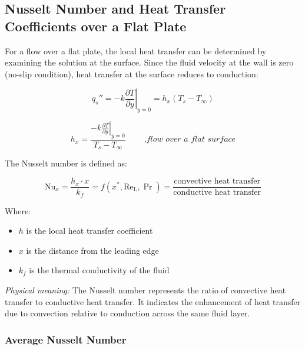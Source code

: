 \subsection*{Nusselt Number and Heat Transfer Coefficients over a Flat Plate}

For a flow over a flat plate, the local heat transfer can be determined by examining the solution at the surface. Since the fluid velocity at the wall is zero (no-slip condition), heat transfer at the surface reduces to conduction:

\[
    q_s'' = -k\left.\frac{\partial T}{\partial y}\right|_{y=0} = h_x (T_s - T_\infty)
\]
\begin{definition}
    \[
            h_x = \frac{-k\left.\frac{\partial T}{\partial y}\right|_{y=0}}{T_s - T_\infty}\ \qquad \textit{,flow over a flat surface}
    \]
\end{definition}
%
The Nusselt number is defined as:
\begin{definition}
\[
    \text{Nu}_x =  \frac{h_x \cdot x}{k_f} = f(x^*,\operatorname{Re_L}, \operatorname{Pr}) = \frac{\text{convective heat transfer}}{\text{conductive heat transfer}}
\]
\end{definition}
%
Where:
\begin{itemize}
    \item $h$ is the local heat transfer coefficient
    \item $x$ is the distance from the leading edge
    \item $k_f$ is the thermal conductivity of the fluid
\end{itemize}

\textit{Physical meaning:} The Nusselt number represents the ratio of convective heat transfer to conductive heat transfer. It indicates the enhancement of heat transfer due to convection relative to conduction across the same fluid layer.

\subsubsection*{Average Nusselt Number}

